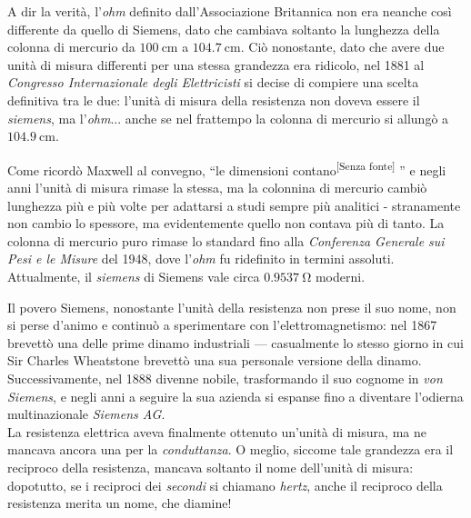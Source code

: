 \begin{digressionwt}
	A dir la verità, l'\textit{ohm} definito dall'Associazione Britannica non era neanche così differente da quello di Siemens, dato che cambiava soltanto la lunghezza della colonna di mercurio da $\SI{100}{\centi\meter}$ a $\SI{104.7}{\centi\meter}$. Ciò nonostante, dato che avere due unità di misura differenti per una stessa grandezza era ridicolo, nel 1881 al \textit{Congresso Internazionale degli Elettricisti} si decise di compiere una scelta definitiva tra le due: l'unità di misura della resistenza non doveva essere il \textit{siemens}, ma l'\textit{ohm}... anche se nel frattempo la colonna di mercurio si allungò a $\SI{104.9}{\centi\meter}$.\newline
	
	\noindent Come ricordò Maxwell al convegno, ``le dimensioni contano\textsuperscript{[Senza fonte]}
	 '' e negli anni l'unità di misura rimase la stessa, ma la colonnina di mercurio cambiò lunghezza più e più volte per adattarsi a studi sempre più analitici - stranamente non cambio lo spessore, ma evidentemente quello non contava più di tanto. La colonna di mercurio puro rimase lo standard fino alla \textit{Conferenza Generale sui Pesi e le Misure} del 1948, dove l'\textit{ohm} fu ridefinito in termini assoluti. Attualmente, il \textit{siemens} di Siemens vale circa $\SI{0.9537}{\ohm}$ moderni.
	
	Il povero Siemens, nonostante l'unità della resistenza non prese il suo nome, non si perse d'animo e continuò a sperimentare con l'elettromagnetismo: nel 1867 brevettò una delle prime dinamo industriali --- casualmente lo stesso giorno in cui Sir Charles Wheatstone brevettò una sua personale versione della dinamo. Successivamente, nel 1888 divenne nobile, trasformando il suo cognome in \textit{von Siemens}, e negli anni a seguire la sua azienda si espanse fino a diventare l'odierna multinazionale \textit{Siemens AG}.\newline~\\
	La resistenza elettrica aveva finalmente ottenuto un'unità di misura, ma ne mancava ancora una per la \textit{conduttanza}. O meglio, siccome tale grandezza era il reciproco della resistenza, mancava soltanto il nome dell'unità di misura: dopotutto, se i reciproci dei \textit{secondi} si chiamano \textit{hertz}, anche il reciproco della resistenza merita un nome, che diamine!
	

\end{digressionwt}
